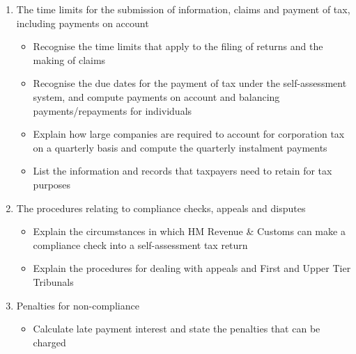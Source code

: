 \documentclass[
  letterpaper,
  DIV=11,
  numbers=noendperiod]{scrartcl}
\providecommand{\tightlist}{%
  \setlength{\itemsep}{0pt}\setlength{\parskip}{0pt}}
\begin{document}
\begin{enumerate}
\begin{enumerate}
    \begin{itemize}
    \tightlist
    \item
      Explain and apply the features of the self-assessment system as it
      applies to individuals
    \item
      Explain and apply the features of the self-assessment system as it
      applies to companies, including the use of iXBRL
    \end{itemize}
  \item
    The time limits for the submission of information, claims and
    payment of tax, including payments on account

    \begin{itemize}
    \tightlist
    \item
      Recognise the time limits that apply to the filing of returns and
      the making of claims
    \item
      Recognise the due dates for the payment of tax under the
      self-assessment system, and compute payments on account and
      balancing payments/repayments for individuals
    \item
      Explain how large companies are required to account for
      corporation tax on a quarterly basis and compute the quarterly
      instalment payments
    \item
      List the information and records that taxpayers need to retain for
      tax purposes
    \end{itemize}
  \item
    The procedures relating to compliance checks, appeals and disputes

    \begin{itemize}
    \tightlist
    \item
      Explain the circumstances in which HM Revenue \& Customs can make
      a compliance check into a self-assessment tax return
    \item
      Explain the procedures for dealing with appeals and First and
      Upper Tier Tribunals
    \end{itemize}
  \item
    Penalties for non-compliance

    \begin{itemize}
    \tightlist
    \item
      Calculate late payment interest and state the penalties that can
      be charged
    \end{itemize}
  \end{enumerate}
\end{enumerate}
\end{document}
